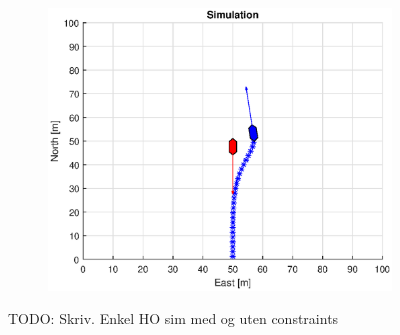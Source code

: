 \begin{figure}[!b]
\begin{subfigure}[b]{0.499\textwidth}
        \centering
        \includegraphics[width=\textwidth]{Images/Figures/Enkel_HO/Simple0_f600_Frame3}
    \end{subfigure}
    \hfill
    \caption{TODO: Skriv. Enkel HO sim med og uten constraints}
\end{figure}%

